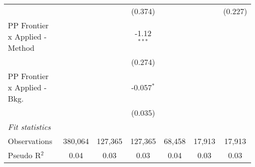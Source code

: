 \begin{tabular}{lcccccc}
                                  &                &               & (0.374)       &                &              & (0.227)\\   
   PP Frontier x Applied - Method &                &               & -1.12$^{***}$ &                &              &   \\   
                                  &                &               & (0.274)       &                &              &   \\   
   PP Frontier x Applied - Bkg.   &                &               & -0.057$^{*}$  &                &              &   \\   
                                  &                &               & (0.035)       &                &              &   \\   
   \midrule
   \emph{Fit statistics}\\
   Observations                   & 380,064        & 127,365       & 127,365       & 68,458         & 17,913       & 17,913\\  
   Pseudo R$^2$                   & 0.04           & 0.03          & 0.03          & 0.04           & 0.03         & 0.03\\  
   

\end{tabular}
